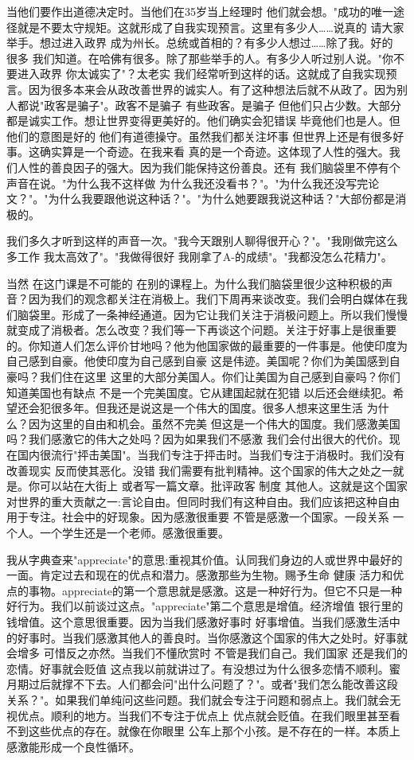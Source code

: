 当他们要作出道德决定时。当他们在35岁当上经理时 他们就会想。"成功的唯一途径就是不要太守规矩。这就形成了自我实现预言。这里有多少人……说真的 请大家举手。想过进入政界 成为州长。总统或首相的？有多少人想过……除了我。好的 很多 我们知道。在哈佛有很多。除了那些举手的人。有多少人听过别人说。"你不要进入政界 你太诚实了"？太老实 我们经常听到这样的话。这就成了自我实现预言。因为很多本来会从政改善世界的诚实人。有了这种想法后就不从政了。因为别人都说"政客是骗子"。政客不是骗子 有些政客。是骗子 但他们只占少数。大部分都是诚实工作。想让世界变得更美好的。他们确实会犯错误 毕竟他们也是人。但他们的意图是好的 他们有道德操守。虽然我们都关注坏事 但世界上还是有很多好事。这确实算是一个奇迹。在我来看 真的是一个奇迹。这体现了人性的强大。我们人性的善良因子的强大。因为我们能保持这份善良。还有 我们脑袋里不停有个声音在说。"为什么我不这样做 为什么我还没看书？"。"为什么我还没写完论文？"。"为什么我要跟他说这种话？"。"为什么她要跟我说这种话？"大部份都是消极的。 

我们多久才听到这样的声音一次。"我今天跟别人聊得很开心？"。"我刚做完这么多工作 我太高效了"。"我做得很好 我刚拿了A-的成绩"。"我都没怎么花精力"。 

当然 在这门课是不可能的 在别的课程上。为什么我们脑袋里很少这种积极的声音？因为我们的观念都关注在消极上。我们下周再来谈改变。我们会明白媒体在我们脑袋里。形成了一条神经通道。因为它让我们关注于消极问题上。所以我们慢慢就变成了消极者。怎么改变？我们等一下再谈这个问题。关注于好事上是很重要的。你知道人们怎么评价甘地吗？他为他国家做的最重要的一件事是。他使印度为自己感到自豪。他使印度为自己感到自豪 这是伟迹。美国呢？你们为美国感到自豪吗？我们住在这里 这里的大部分美国人。你们让美国为自己感到自豪吗？你们知道美国也有缺点 不是一个完美国度。它从建国起就在犯错 以后还会继续犯。希望还会犯很多年。但我还是说这是一个伟大的国度。很多人想来这里生活 为什么？因为这里的自由和机会。虽然不完美 但这是一个伟大的国度。我们感激美国吗？我们感激它的伟大之处吗？因为如果我们不感激 我们会付出很大的代价。现在国内很流行"抨击美国"。当我们专注于抨击时。当我们专注于消极时。我们没有改善现实 反而使其恶化。没错 我们需要有批判精神。这个国家的伟大之处之一就是。你可以站在大街上 或者写一篇文章。批评政客 制度 其他人。这就是这个国家对世界的重大贡献之一:言论自由。但同时我们有这种自由。我们应该把这种自由用于专注。社会中的好现象。因为感激很重要 不管是感激一个国家。一段关系 一个人。一个学生还是一个老师。感激很重要。 

我从字典查来"appreciate"的意思:重视其价值。认同我们身边的人或世界中最好的一面。肯定过去和现在的优点和潜力。感激那些为生物。赐予生命 健康 活力和优点的事物。appreciate的第一个意思就是感激。这是一种好行为。但它不只是一种好行为。我们以前谈过这点。"appreciate"第二个意思是增值。经济增值 银行里的钱增值。这个意思很重要。因为当我们感激好事时 好事增值。当我们感激生活中的好事时。当我们感激其他人的善良时。当你感激这个国家的伟大之处时。好事就会增多 可惜反之亦然。当我们不懂欣赏时 不管是我们自己。我们国家 还是我们的恋情。好事就会贬值 这点我以前就讲过了。有没想过为什么很多恋情不顺利。蜜月期过后就撑不下去。人们都会问"出什么问题了？"。或者"我们怎么能改善这段关系？"。如果我们单纯问这些问题。我们就会专注于问题和弱点上。我们就会无视优点。顺利的地方。当我们不专注于优点上 优点就会贬值。在我们眼里甚至看不到这些优点的存在。就像在你眼里 公车上那个小孩。是不存在的一样。本质上 感激能形成一个良性循环。 

